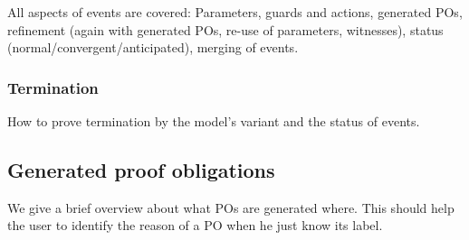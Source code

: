 All aspects of events are covered: Parameters, guards and actions, generated POs, refinement (again with generated POs, re-use of parameters, witnesses), status (normal/convergent/anticipated), merging of events.

\subsubsection{Termination}

How to prove termination by the model's variant and the status of events.
  
\subsection{Generated proof obligations}

We give a brief overview about what POs are generated where. This should help the user to identify the reason of a PO when he just know its label.
